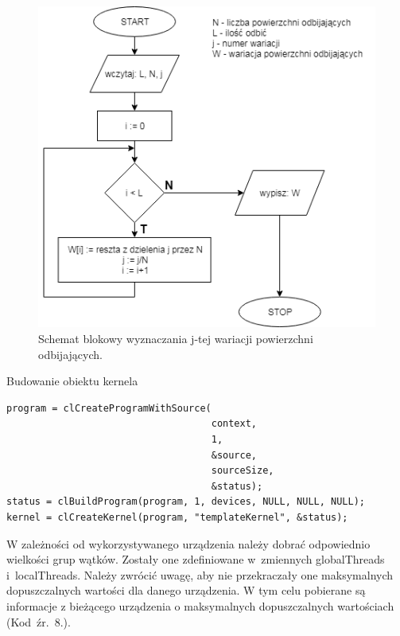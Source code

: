 \begin{figure}[H]
        \centering
                \centering
                \includegraphics[width=12cm]{wariacja}
	\caption{Schemat blokowy wyznaczania j-tej wariacji powierzchni odbijających.}
\end{figure}

\begin{program}[H]
\caption{Budowanie obiektu kernela}
\begin{lstlisting}
program = clCreateProgramWithSource(
                                    context, 
                                    1, 
                                    &source,
                                    sourceSize,
                                    &status);
status = clBuildProgram(program, 1, devices, NULL, NULL, NULL);
kernel = clCreateKernel(program, "templateKernel", &status);
\end{lstlisting}
\end{program}

W zależności od wykorzystywanego urządzenia należy dobrać odpowiednio wielkości grup wątków. Zostały one zdefiniowane w~zmiennych globalThreads i~localThreads. Należy zwrócić uwagę, aby nie przekraczały one maksymalnych dopuszczalnych wartości dla danego urządzenia. W tym celu pobierane są informacje z bieżącego urządzenia o maksymalnych dopuszczalnych wartościach (Kod~źr.~8.).

